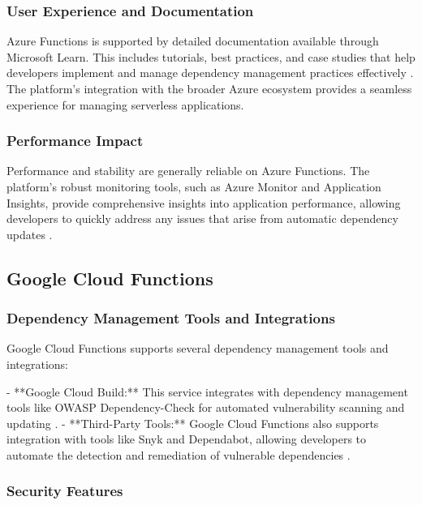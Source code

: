 \documentclass[sigconf]{acmart}
\begin{document}
\subsubsection{User Experience and Documentation}

Azure Functions is supported by detailed documentation available through Microsoft Learn. This includes tutorials, best practices, and case studies that help developers implement and manage dependency management practices effectively \cite{azureLearn2023}. The platform's integration with the broader Azure ecosystem provides a seamless experience for managing serverless applications.

\subsubsection{Performance Impact}

Performance and stability are generally reliable on Azure Functions. The platform's robust monitoring tools, such as Azure Monitor and Application Insights, provide comprehensive insights into application performance, allowing developers to quickly address any issues that arise from automatic dependency updates \cite{azurePerformance2023}.

\subsection{Google Cloud Functions}

\subsubsection{Dependency Management Tools and Integrations}

Google Cloud Functions supports several dependency management tools and integrations:

- **Google Cloud Build:** This service integrates with dependency management tools like OWASP Dependency-Check for automated vulnerability scanning and updating \cite{googleBuild2023}.
- **Third-Party Tools:** Google Cloud Functions also supports integration with tools like Snyk and Dependabot, allowing developers to automate the detection and remediation of vulnerable dependencies \cite{googlesnyk2023}.

\subsubsection{Security Features}
\end{document}
